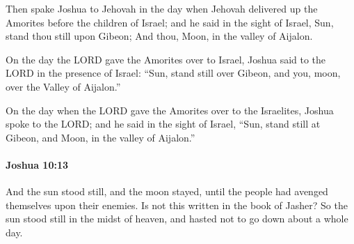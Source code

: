 			\begin{versebox}
					\item[BHS] 
					\item[ASV] Then spake Joshua to Jehovah in the day when Jehovah delivered up the Amorites before the children of Israel; and he said in the sight of Israel, Sun, stand thou still upon Gibeon; And thou, Moon, in the valley of Aijalon.
					\item[NIV] On the day the LORD gave the Amorites over to Israel, Joshua said to the LORD in the presence of Israel: “Sun, stand still over Gibeon, and you, moon, over the Valley of Aijalon.”
					\item[NRSV] On the day when the LORD gave the Amorites over to the Israelites, Joshua spoke to the LORD; and he said in the sight of Israel, “Sun, stand still at Gibeon, and Moon, in the valley of Aijalon.”
			\end{versebox}

		\paragraph{Joshua 10:13} %
			\label{JOSHUA-10-13}

			And the sun stood still, and the moon stayed, until the people had avenged themselves upon their enemies. Is not this written in the book of Jasher? So the sun stood still in the midst of heaven, and hasted not to go down about a whole day.

